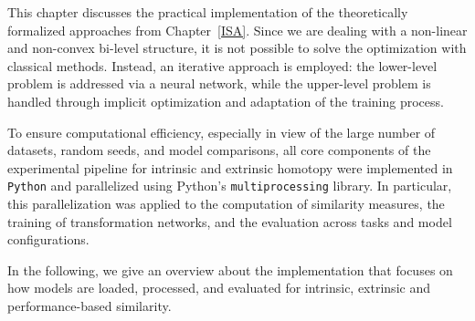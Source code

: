 This chapter discusses the practical implementation of the theoretically formalized approaches from Chapter~\ref{ISA}.
Since we are dealing with a non-linear and non-convex bi-level structure, it is not possible to solve the optimization with classical methods.
Instead, an iterative approach is employed: the lower-level problem is addressed via a neural network, while the upper-level problem is handled through implicit optimization and adaptation of the training process.

To ensure computational efficiency, especially in view of the large number of datasets, random seeds, and model comparisons, all core components of the experimental pipeline for intrinsic and extrinsic homotopy were implemented in \texttt{Python} and parallelized using Python's \texttt{multiprocessing} library. 
In particular, this parallelization was applied to the computation of similarity measures, the training of transformation networks, and the evaluation across tasks and model configurations.


In the following, we give an overview about the implementation that focuses on how models are loaded, processed, and evaluated for intrinsic, extrinsic and performance-based similarity.



